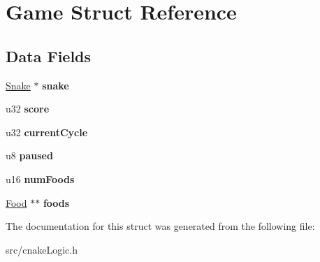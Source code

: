 \hypertarget{struct_game}{}\section{Game Struct Reference}
\label{struct_game}
\subsection*{Data Fields}
\begin{DoxyCompactItemize}
\item 
\hyperlink{struct_snake}{Snake} $\ast$ {\bfseries snake}\hypertarget{struct_game_a408cd599ea288e5b692809edb69e65c2}{}\label{struct_game_a408cd599ea288e5b692809edb69e65c2}

\item 
u32 {\bfseries score}\hypertarget{struct_game_aa164f9e96d69917e222030f95185f844}{}\label{struct_game_aa164f9e96d69917e222030f95185f844}

\item 
u32 {\bfseries current\+Cycle}\hypertarget{struct_game_a514de0cd72def19660b79631e4c1bdd4}{}\label{struct_game_a514de0cd72def19660b79631e4c1bdd4}

\item 
u8 {\bfseries paused}\hypertarget{struct_game_a3ade7f893f61c2117f2ed3b49842cd64}{}\label{struct_game_a3ade7f893f61c2117f2ed3b49842cd64}

\item 
u16 {\bfseries num\+Foods}\hypertarget{struct_game_a6eb06bc26a099c346c277fcaa4a1f30e}{}\label{struct_game_a6eb06bc26a099c346c277fcaa4a1f30e}

\item 
\hyperlink{struct_food}{Food} $\ast$$\ast$ {\bfseries foods}\hypertarget{struct_game_aab913a1e81d59801882afbd45fa496d1}{}\label{struct_game_aab913a1e81d59801882afbd45fa496d1}

\end{DoxyCompactItemize}


The documentation for this struct was generated from the following file\+:\begin{DoxyCompactItemize}
\item 
src/cnake\+Logic.\+h\end{DoxyCompactItemize}
